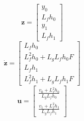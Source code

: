 \documentclass[a4paper]{article}
\begin{document}
\begin{equation}
\mathbf{z} =
\left[ \begin{array}{ccc}
y_0 \\
L_f h_0 \\
y_1 \\
L_f h_1
\end{array} \right]
\end{equation}
\begin{equation}
\mathbf{\dot{z}} =
\left[ \begin{array}{ccc}
L_f h_0 \\
L_f^2 h_0 + L_g L_f h_0 F \\
L_f h_1 \\
L_f^2 h_1 + L_g L_f h_1 F
\end{array} \right]
\end{equation}
\begin{equation}
\mathbf{u} =
\left[ \begin{array}{c}
\frac{v_0 + L_f^2 h_0}{L_g L_f h_0} \\
\frac{v_1 + L_f^2 h_1}{L_g L_f h_1} 
\end{array} \right]
\end{equation}
\end{document}
